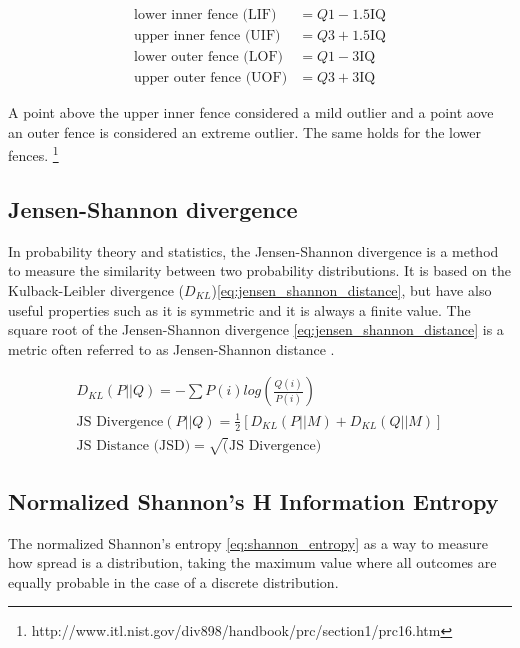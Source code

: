 \documentclass[a4paper, 12pt]{article}
\begin{document}
\begin{equation}
\begin{split}
\text{lower inner fence (LIF)} & = Q1 - 1.5  \text{IQ} \\
\text{upper inner fence (UIF)} & = Q3 + 1.5  \text{IQ} \\
\text{lower outer fence (LOF)} & = Q1 - 3  \text{IQ} \\
\text{upper outer fence (UOF)} & = Q3 + 3  \text{IQ}
\end{split}
\label{eq:fences}
\end{equation}

\par A point above the upper inner fence considered a mild outlier and a point aove an outer fence is considered an extreme outlier. The same holds for the lower fences. \footnote{http://www.itl.nist.gov/div898/handbook/prc/section1/prc16.htm}

\subsection{Jensen-Shannon divergence}

\par In probability theory and statistics, the Jensen-Shannon divergence is a method to measure the similarity between two probability distributions. It is based on the Kulback-Leibler divergence  ($D_{KL}$)\ref{eq:jensen_shannon_distance}, but have also useful properties such as it is symmetric and it is always a finite value. The square root of the Jensen-Shannon divergence \ref{eq:jensen_shannon_distance} is a metric often referred to as Jensen-Shannon distance \cite{fuglede2004jensen}.

\begin{equation}
\begin{split}
D_{KL}(P||Q) = -\sum{P(i) log(\frac{Q(i)}{P(i)})} \\
\text{JS Divergence}(P||Q) = \frac{1}{2}[D_{KL}(P||M) + D_{KL}(Q||M)] \\
\text{JS Distance (JSD)} = \sqrt(\text{JS Divergence})
\end{split}
\label{eq:jensen_shannon_distance}
\end{equation}


\subsection{Normalized Shannon's H Information Entropy}

\par The normalized Shannon's entropy \ref{eq:shannon_entropy} as a way to measure how spread is a distribution, taking the maximum value where all outcomes are equally probable in the case of a discrete distribution.
\end{document}
